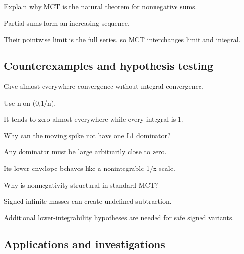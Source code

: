 \begin{exercise}\label{exr:iii04-expand-09}
Explain why MCT is the natural theorem for nonnegative sums.
\end{exercise}
\begin{hint}
Partial sums form an increasing sequence.
\end{hint}
\begin{solution}
Their pointwise limit is the full series, so MCT interchanges limit and integral.
\end{solution}

\subsection*{Counterexamples and hypothesis testing}

\begin{exercise}\label{exr:iii04-expand-10}
Give almost-everywhere convergence without integral convergence.
\end{exercise}
\begin{hint}
Use n on (0,1/n).
\end{hint}
\begin{solution}
It tends to zero almost everywhere while every integral is 1.
\end{solution}

\begin{exercise}[No dominator]\label{exr:iii04-expand-11}
Why can the moving spike not have one L1 dominator?
\end{exercise}
\begin{hint}
Any dominator must be large arbitrarily close to zero.
\end{hint}
\begin{solution}
Its lower envelope behaves like a nonintegrable 1/x scale.
\end{solution}

\begin{exercise}\label{exr:iii04-expand-12}
Why is nonnegativity structural in standard MCT?
\end{exercise}
\begin{hint}
Signed infinite masses can create undefined subtraction.
\end{hint}
\begin{solution}
Additional lower-integrability hypotheses are needed for safe signed variants.
\end{solution}

\subsection*{Applications and investigations}

